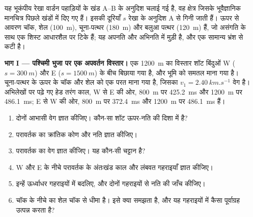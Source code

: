 \begin{problem}
\label{pb:b3:exploration-seismology:1}
यह भूकंपीय रेखा वार्डन पहाड़ियों के खंड A--B के अनुदिश चलाई गई है, वह क्षेत्र जिसके
भूवैज्ञानिक मानचित्र पिछले खंडों में दिए गए हैं। इसकी दूरियाँ $s$ रेखा के अनुदिश
A से गिनी जाती हैं। ऊपर से आवरण चॉक, शेल (\qty{100}{m}),
चूना-पत्थर (\qty{180}{m}) और बलुआ पत्थर (\qty{120}{m}) हैं, जो असंगति के साथ
एक शिस्ट आधारशैल पर टिके हैं; यह अपनति और अभिनति में मुड़ी है, और
एक सामान्य भ्रंश से कटी है।

\medskip
\noindent\textbf{भाग I --- पश्चिमी भुजा पर एक अपवर्तन विस्तार।} एक
\qty{1200}{m} का विस्तार शॉट बिंदुओं W ($s = \qty{300}{m}$) और E
($s = \qty{1500}{m}$) के बीच बिछाया गया है, और भूमि को समतल माना गया है। चूना-पत्थर के ऊपर
के चॉक और शेल को एक परत माना गया है, जिसका $v_1 = \qty{2.40}{km.s^{-1}}$ वेग है। अभिलेखों पर
पढ़े गए हेड तरंग काल, W से E की ओर, \qty{800}{m} पर \qty{425.2}{ms} और
\qty{1200}{m} पर \qty{486.1}{ms}; E से W की ओर,
\qty{800}{m} पर \qty{372.4}{ms} और \qty{1200}{m} पर \qty{486.1}{ms} हैं।
\begin{enumerate}
  \item दोनों आभासी वेग ज्ञात कीजिए। कौन-सा शॉट ऊपर-नति की दिशा में है?
  \item परावर्तक का क्रांतिक कोण और नति ज्ञात कीजिए।
  \item परावर्तक का वेग ज्ञात कीजिए। यह कौन-सी चट्टान है?
  \item W और E के नीचे परावर्तक के अंतःखंड काल और लंबवत गहराइयाँ
        ज्ञात कीजिए।
  \item इन्हें ऊर्ध्वाधर गहराइयों में बदलिए, और दोनों गहराइयों से नति की जाँच कीजिए।
  \item चॉक के नीचे का शेल चॉक से धीमा है।  इसे क्या
        समझता है, और यह गहराइयों में कैसा पूर्वाग्रह उत्पन्न करता है?
\end{enumerate}


\end{problem}

